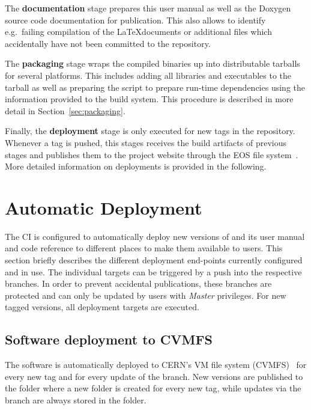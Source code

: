The \textbf{documentation} stage prepares this user manual as well as the Doxygen source code documentation for publication.
This also allows to identify e.g.\ failing compilation of the \LaTeX documents or additional files which accidentally have not been committed to the repository.

The \textbf{packaging} stage wraps the compiled binaries up into distributable tarballs for several platforms.
This includes adding all libraries and executables to the tarball as well as preparing the  script to prepare run-time dependencies using the information provided to the build system.
This procedure is described in more detail in Section~\ref{sec:packaging}.

Finally, the \textbf{deployment} stage is only executed for new tags in the repository.
Whenever a tag is pushed, this stages receives the build artifacts of previous stages and publishes them to the \apsq project website through the EOS file system~\cite{eos}. More detailed information on deployments is provided in the following.

\section{Automatic Deployment}

The CI is configured to automatically deploy new versions of \apsq and its user manual and code reference to different places to make them available to users.
This section briefly describes the different deployment end-points currently configured and in use.
The individual targets can be triggered by a push into the respective branches.
In order to prevent accidental publications, these branches are protected and can only be updated by users with \emph{Master} privileges.
For new tagged versions, all deployment targets are executed.

\subsection{Software deployment to CVMFS}

The software is automatically deployed to CERN's VM file system (CVMFS)~\cite{cvmfs} for every new tag and for every update of the  branch.
New versions are published to the folder  where a new folder is created for every new tag, while updates via the branch are always stored in the  folder.

